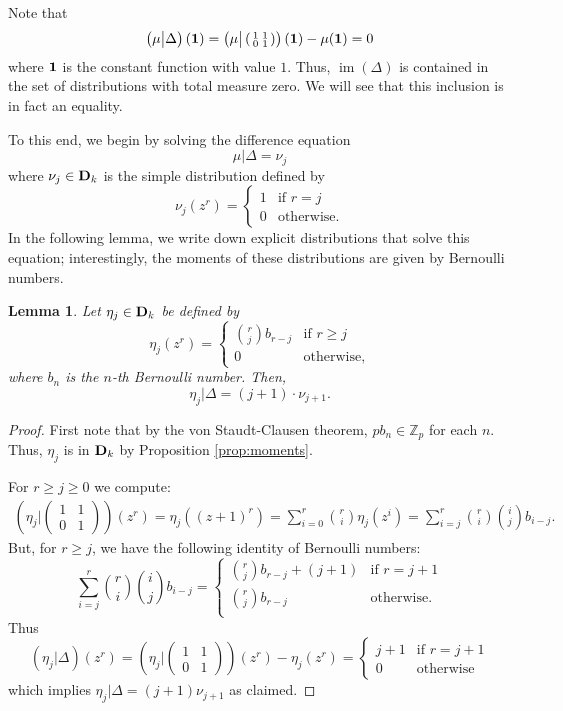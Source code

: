 \documentclass{amsart}
\theoremstyle{plain}
\newtheorem{lemma}[thm]{Lemma}
\theoremstyle{definition}
\newcommand{\bD}{{\bf D}}
\newcommand{\Z}{{\mathbb Z}}
\newcommand{\Zp}{\Z_p}
\newcommand{\psmallmat}[4]{\left( \begin{smallmatrix} #1 & #2 \\ #3 & #4 \end{smallmatrix} \right)}
\renewcommand{\binom}[2]{\genfrac{(}{)}{0pt}{}{#1}{#2}}
\newcommand{\Dvrig}[1]{\bD_{#1}}
\newcommand{\Dkrig}{\Dvrig{k}}
\DeclareMathOperator{\im}{im}
\begin{document}
Note that
$$
\left( \mu\big| \Delta \right)({\bf 1}) = \left( \mu\big|
\psmallmat{1}{1}{0}{1} \right)({\bf 1}) - \mu({\bf 1}) = 0
$$
where ${\bf 1}$ is the constant function with value $1$. Thus, $\im(\Delta)$ is contained in the set of distributions with total measure zero. We will see that this inclusion is in fact an equality.  

To this end, we begin by solving the difference equation
$$
\mu \big| \Delta = \nu_j
$$
where $\nu_j \in \Dkrig$ is the simple distribution defined by
$$
\nu_j(z^r) = \begin{cases} 1 & \text{if~} r=j \\ 0 & \text{otherwise}. \end{cases}
$$
In the following lemma, we write down explicit distributions that solve this equation; interestingly, the moments of these distributions are given by Bernoulli numbers.

\begin{lemma}
\label{lemma:eta}
Let $\eta_j \in \Dkrig$ be defined by
$$
\eta_j(z^r)  =  \begin{cases} \binom{r}{j} b_{r-j} & \text{if~} r \geq j \\ 0 & \text{otherwise}, \end{cases}
$$
where $b_n$ is the $n$-th Bernoulli number.
Then,
$$
\eta_j \big| \Delta = (j+1) \cdot \nu_{j+1}.
$$
\end{lemma}

\begin{proof}
First note that by the von Staudt-Clausen theorem, $p b_n \in \Zp$ for each $n$.
Thus, $\eta_j$ is in $\Dkrig$ by Proposition \ref{prop:moments}.

For $r \geq j \geq 0$ we compute:
\begin{align*}
\left( \eta_j \big| \psmallmat{1}{1}{0}{1} \right)(z^r)
=
\eta_j( (z+1)^r) 
=
\sum_{i=0}^r \binom{r}{i} \eta_j(z^i) 
=
\sum_{i=j}^r \binom{r}{i} \binom{i}{j} b_{i-j}.
\end{align*}
But, for $r \geq j$, we have the following identity of Bernoulli numbers:
$$
\sum_{i=j}^r \binom{r}{i} \binom{i}{j} b_{i-j} =
\begin{cases}
\binom{r}{j} b_{r-j} + (j+1) & \text{if~} r = j+1\\
\binom{r}{j} b_{r-j}   & \text{otherwise}. \\
\end{cases}
$$
Thus
$$
(\eta_j\big| \Delta)(z^r) = 
(\eta_j\big| \psmallmat{1}{1}{0}{1})(z^r) - \eta_j(z^r) =
\begin{cases} 
j+1 & \text{if~} r = j+1 \\ 
0 &  \text{otherwise}
\end{cases}
$$
which implies $\eta_j \big| \Delta = (j+1) \nu_{j+1}$
as claimed.  
\end{proof}
\end{document}
